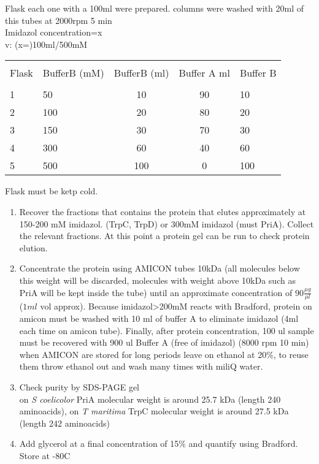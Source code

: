\documentclass[]{article}
\begin{document}
Flask each one with a 100ml were prepared. columns were washed with 20ml
of this tubes at 2000rpm 5 min\\
Imidazol concentration=x\\
v: (x=)100ml/500mM

\label{my-label enzyme}

\begin{tabular}{ l l c c l}
\hline \\ [-1.5ex]
Flask & BufferB (mM)   & BufferB (ml)  & Buffer A ml & Buffer B  \\  [1ex]
\hline \\ [-1.5ex]
1 & 50& 10&  90& 10 \\  [1ex]
2 & 100& 20& 80& 20 \\  [1ex]
3 & 150& 30& 70 & 30 \\  [1ex]
4 & 300& 60& 40 & 60 \\  [1ex]
5 & 500& 100& 0& 100 \\  [1ex]
\hline
\end{tabular}

Flask must be ketp cold.

\begin{enumerate}
\def\labelenumi{\arabic{enumi}.}
\setcounter{enumi}{6}
\item
  Recover the fractions that contains the protein that elutes
  approximately at 150-200 mM imidazol. (TrpC, TrpD) or 300mM imidazol
  (must PriA). Collect the relevant fractions. At this point a protein
  gel can be run to check protein elution.
\item
  Concentrate the protein using AMICON tubes 10kDa (all molecules below
  this weight will be discarded, molecules with weight above 10kDa such
  as PriA will be kept inside the tube) until an approximate
  concentration of \(90 \frac{\mu g}{\mu l}\) (\(1ml\) vol approx).
  Because imidazol\textgreater{}200mM reacts with Bradford, protein on
  amicon must be washed with 10 ml of buffer A to eliminate imidazol
  (4ml each time on amicon tube). Finally, after protein concentration,
  100 ul sample must be recovered with 900 ul Buffer A (free of
  imidazol) (8000 rpm 10 min) when AMICON are stored for long periods
  leave on ethanol at 20\%, to reuse them throw ethanol out and wash
  many times with miliQ water.
\item
  Check purity by SDS-PAGE gel\\
  on \emph{S coelicolor} PriA molecular weight is around 25.7 kDa
  (length 240 aminoacids), on \emph{T maritima} TrpC molecular weight is
  around 27.5 kDa (length 242 aminoacids)
\item
  Add glycerol at a final concentration of 15\% and quantify using
  Bradford. Store at -80C
\end{enumerate}
\end{document}
